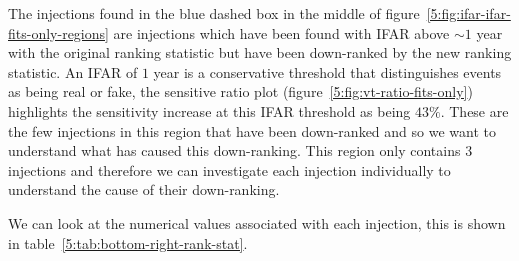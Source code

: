 The injections found in the blue dashed box in the middle of figure~\ref{5:fig:ifar-ifar-fits-only-regions} are injections which have been found with IFAR above ${\sim}1$ year with the original ranking statistic but have been down-ranked by the new ranking statistic. An IFAR of $1$ year is a conservative threshold that distinguishes \gwadj events as being real or fake, the sensitive ratio plot (figure~\ref{5:fig:vt-ratio-fits-only}) highlights the sensitivity increase at this IFAR threshold as being $43\%$. These are the few injections in this region that have been down-ranked and so we want to understand what has caused this down-ranking. This region only contains $3$ injections and therefore we can investigate each injection individually to understand the cause of their down-ranking.

We can look at the numerical values associated with each injection, this is shown in table~\ref{5:tab:bottom-right-rank-stat}.
%
